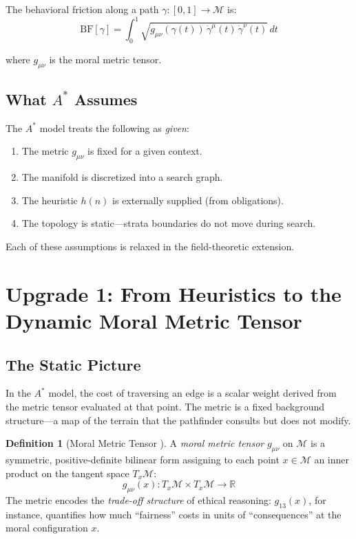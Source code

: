 \documentclass[12pt]{article}
\theoremstyle{definition}
\newtheorem{definition}[theorem]{Definition}
\theoremstyle{remark}
\newcommand{\M}{\mathcal{M}}
\newcommand{\R}{\mathbb{R}}
\newcommand{\BF}{\mathrm{BF}}
\begin{document}
The behavioral friction along a path $\gamma: [0,1] \to \M$ is:
\begin{equation}\label{eq:bf}
\BF[\gamma] = \int_0^1 \sqrt{g_{\mu\nu}(\gamma(t))\, \dot{\gamma}^\mu(t)\, \dot{\gamma}^\nu(t)}\, dt
\end{equation}

where $g_{\mu\nu}$ is the moral metric tensor.

\subsection{What $A^*$ Assumes}

The $A^*$ model treats the following as \emph{given}:
\begin{enumerate}
    \item The metric $g_{\mu\nu}$ is fixed for a given context.
    \item The manifold is discretized into a search graph.
    \item The heuristic $h(n)$ is externally supplied (from obligations).
    \item The topology is static---strata boundaries do not move during search.
\end{enumerate}

Each of these assumptions is relaxed in the field-theoretic extension.


\section{Upgrade 1: From Heuristics to the Dynamic Moral Metric Tensor}
\label{sec:metric}

\subsection{The Static Picture}

In the $A^*$ model, the cost of traversing an edge is a scalar weight derived from the metric tensor evaluated at that point. The metric is a fixed background structure---a map of the terrain that the pathfinder consults but does not modify.

\begin{definition}[Moral Metric Tensor {\citep[Ch.~6]{anonymous2026ge}}]
A \emph{moral metric tensor} $g_{\mu\nu}$ on $\M$ is a symmetric, positive-definite bilinear form assigning to each point $x \in \M$ an inner product on the tangent space $T_x\M$:
\[
g_{\mu\nu}(x): T_x\M \times T_x\M \to \R
\]
The metric encodes the \emph{trade-off structure} of ethical reasoning: $g_{13}(x)$, for instance, quantifies how much ``fairness'' costs in units of ``consequences'' at the moral configuration $x$.
\end{definition}
\end{document}
